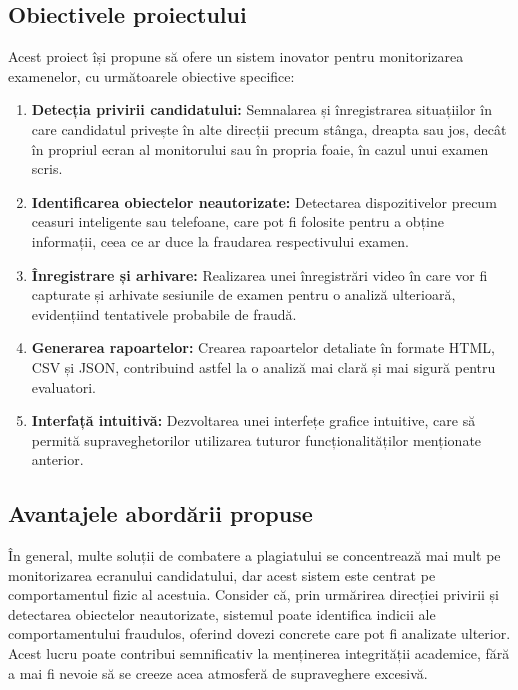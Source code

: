 \documentclass[12pt,a4paper]{article}
\begin{document}
\subsection{Obiectivele proiectului}

Acest proiect își propune să ofere un sistem inovator pentru monitorizarea examenelor, cu următoarele obiective specifice:

\begin{enumerate}[label=\arabic*.]
    \item \textbf{Detecția privirii candidatului:} Semnalarea și înregistrarea situațiilor
    în care candidatul privește în alte direcții precum stânga, dreapta sau jos, 
    decât în propriul ecran al monitorului sau în propria foaie, în cazul unui examen scris.
    
    \item \textbf{Identificarea obiectelor neautorizate:} Detectarea dispozitivelor precum
    ceasuri inteligente sau telefoane, care pot fi folosite pentru a obține informații, 
    ceea ce ar duce la fraudarea respectivului examen.
    
    \item \textbf{Înregistrare și arhivare:} Realizarea unei înregistrări video în care 
    vor fi capturate și arhivate sesiunile de examen pentru o analiză ulterioară, 
    evidențiind tentativele probabile de fraudă.
    
    \item \textbf{Generarea rapoartelor:} Crearea rapoartelor detaliate în formate HTML, CSV și JSON,
    contribuind astfel la o analiză mai clară și mai sigură pentru evaluatori.
    
    \item \textbf{Interfață intuitivă:} Dezvoltarea unei interfețe grafice intuitive, care să permită
    supraveghetorilor utilizarea tuturor funcționalităților menționate anterior.
\end{enumerate}

\subsection{Avantajele abordării propuse}

În general, multe soluții de combatere a plagiatului se concentrează mai mult 
pe monitorizarea ecranului candidatului, dar acest sistem este centrat pe 
comportamentul fizic al acestuia. Consider că, prin urmărirea direcției privirii 
și detectarea obiectelor neautorizate, sistemul poate identifica indicii ale
comportamentului fraudulos, oferind dovezi concrete care pot fi analizate ulterior. 
Acest lucru poate contribui semnificativ la menținerea integrității academice, 
fără a mai fi nevoie să se creeze acea atmosferă de supraveghere excesivă.
\end{document}
